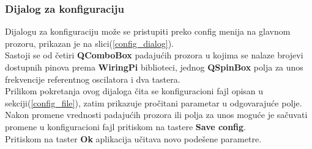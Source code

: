 \subsubsection{Dijalog za konfiguraciju}

Dijalogu za konfiguraciju može se pristupiti preko config menija na glavnom
prozoru, prikazan je na slici(\ref{config_dialog}). \\
Sastoji se od četiri \textbf{QComboBox}\cite{QComboBox} padajućih prozora u
kojima se nalaze brojevi dostupnih pinova prema \textbf{WiringPi} biblioteci, jednog
\textbf{QSpinBox} polja za unos frekvencije referentnog oscilatora i dva tastera. \\

Prilikom pokretanja ovog dijaloga čita se konfiguracioni fajl opisan u
sekciji(\ref{config_file}), zatim prikazuje pročitani parametar u odgovarajuće
polje. \\

Nakon promene vrednosti padajućih prozora ili polja za unos moguće je sačuvati
promene u konfiguracioni fajl pritiskom na tastere \textbf{Save config}. \\
Pritiskom na taster \textbf{Ok} aplikacija učitava novo podešene parametre. \\

\begin{figure}[H]
\end{figure}